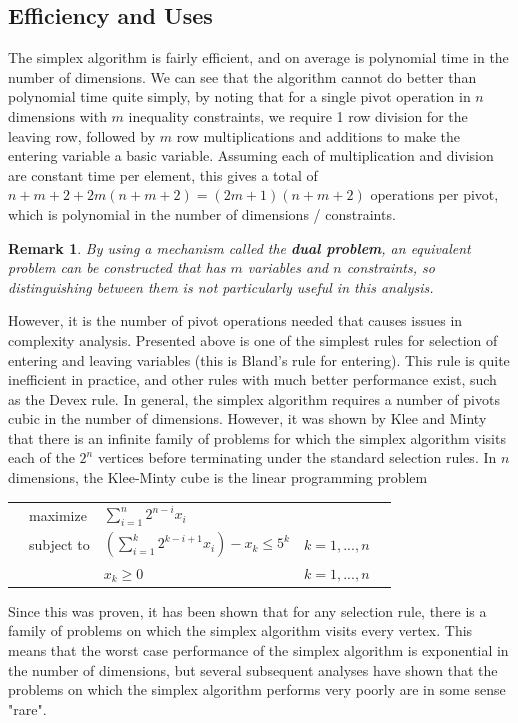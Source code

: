 \documentclass[10pt]{article}
\newtheorem*{remark}{Remark}
\begin{document}
\subsection{Efficiency and Uses}
The simplex algorithm is fairly efficient, and on average is polynomial time in the number of dimensions.\cite{schrijver} We can see that the algorithm cannot do better than polynomial time quite simply, by noting that for a single pivot operation in $n$ dimensions with $m$ inequality constraints, we require 1 row division for the leaving row, followed by $m$ row multiplications and additions to make the entering variable a basic variable. Assuming each of multiplication and division are constant time per element, this gives a total of $n+m+2 + 2m(n+m+2) = (2m+1)(n+m+2)$ operations per pivot, which is polynomial in the number of dimensions / constraints.
\begin{remark}
	By using a mechanism called the \textbf{dual problem}, an equivalent problem can be constructed that has $m$ variables and $n$ constraints, so distinguishing between them is not particularly useful in this analysis.
\end{remark}
However, it is the number of pivot operations needed that causes issues in complexity analysis. Presented above is one of the simplest rules for selection of entering and leaving variables (this is Bland's rule for entering\cite{bland}). This rule is quite inefficient in practice\cite{bernd-bland}, and other rules with much better performance exist, such as the Devex rule\cite{devex}. In general, the simplex algorithm requires a number of pivots cubic in the number of dimensions\cite{borgwardt}. However, it was shown by Klee and Minty that there is an infinite family of problems for which the simplex algorithm visits each of the $2^n$ vertices before terminating under the standard selection rules\cite{klee-minty}. In $n$ dimensions, the Klee-Minty cube is the linear programming problem\\
\begin{tabularx}{\textwidth}{X l l l X}
	& maximize		& $\sum_{i=1}^{n}2^{n-i}x_i$ & & \\
	& subject to	& $(\sum_{i=1}^{k}2^{k-i+1}x_i) - x_k \leq 5^k$ & $k=1,...,n$ &\\
	& 				& $x_k\geq 0$ & $k=1,...,n$ & 
\end{tabularx}
\cite{klee-minty}
Since this was proven, it has been shown that for any selection rule, there is a family of problems on which the simplex algorithm visits every vertex. This means that the worst case performance of the simplex algorithm is exponential in the number of dimensions, but several subsequent analyses have shown that the problems on which the simplex algorithm performs very poorly are in some sense "rare". \cite{spielman}
\end{document}
